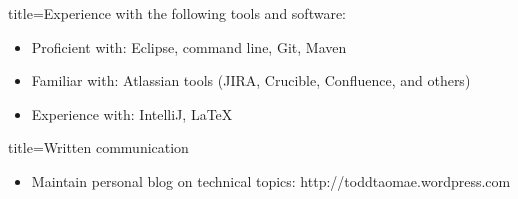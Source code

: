 \documentclass{resume}
\begin{document}
\begin{skill}{title=Experience with the following tools and software:}
    \begin{itemize}
        \item{Proficient with: Eclipse, command line, Git, Maven}
        \item{Familiar with: Atlassian tools (JIRA, Crucible, Confluence, and others)}
        \item{Experience with: IntelliJ, \LaTeX}
    \end{itemize}
\end{skill}

\begin{skill}{title=Written communication}
    \begin{itemize}
        \item{Maintain personal blog on technical topics: http://toddtaomae.wordpress.com}
    \end{itemize}
\end{skill}
\end{document}
